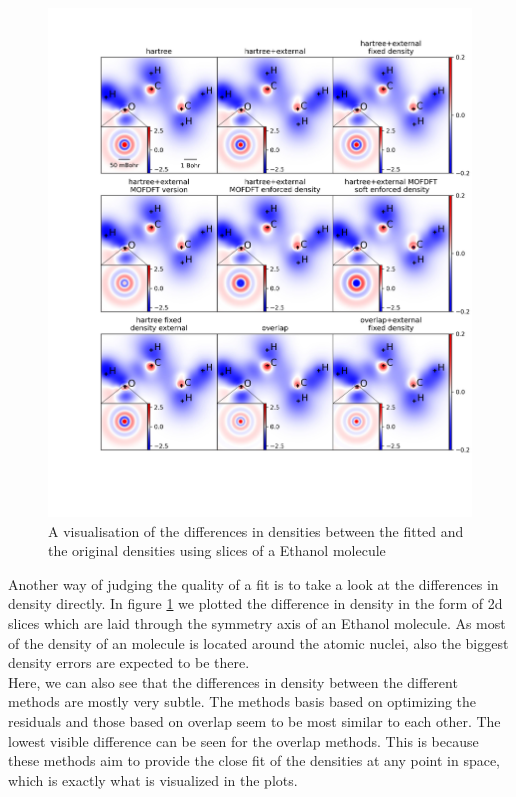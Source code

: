 \begin{figure}
    \centering
    \includegraphics[width=1\textwidth]{chapters/results/results_images/density_fitting_slices_new}
    \caption{A visualisation of the differences in densities between the fitted and the original densities using slices of a Ethanol molecule}
    \label{fig:density_slices_df}
\end{figure}
Another way of judging the quality of a fit is to take a look at the differences in density directly. In figure \ref{fig:density_slices_df} we plotted the difference in density in the form of 2d slices which are laid through the symmetry axis of an Ethanol molecule. As most of the density of an molecule is located around the atomic nuclei, also the biggest density errors are expected to be there. \\
Here, we can also see that the differences in density between the different methods are mostly very subtle. The methods basis based on optimizing the residuals and those based on overlap seem to be most similar to each other. The lowest visible difference can be seen for the overlap methods. This is because these methods aim to provide the close fit of the densities at any point in space, which is exactly what is visualized in the plots.
